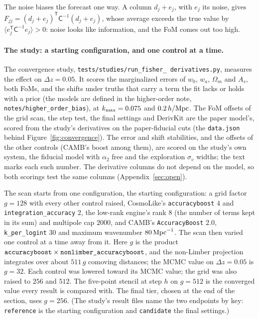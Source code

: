 \documentclass[11pt]{article}
\newcommand{\Cov}{\mathsf{C}}
\newcommand{\T}{^{\mathsf{T}}}
\newcommand{\kmax}{k_{\rm max}}
\newcommand{\hMpc}{\,h/{\rm Mpc}}
\newcommand{\us}{\_\allowbreak}
\begin{document}
The noise biases the forecast one way.  A column $d_j + e_j$, with $e_j$
its noise, gives $F_{jj} = (d_j + e_j)\T\Cov^{-1}(d_j + e_j)$, whose
average exceeds the true value by $\langle e_j\T\Cov^{-1}e_j\rangle > 0$:
noise looks like information, and the FoM comes out too high.

\paragraph{The study: a starting configuration, and one control at a
time.}
The convergence study, \texttt{tests/studies/run\us fisher\us
derivatives.py}, measures the effect on $\Delta z = 0.05$.  It scores
the marginalized errors
of $w_0$, $w_a$, $\Omega_m$
and $A_s$, both FoMs, and the shifts under truths that carry a term the fit lacks or holds
with a prior (the models are
defined in the higher-order note,
\texttt{notes/higher\us order\us bias}), at
$\kmax = 0.075$ and $0.2\hMpc$.  The FoM offsets of the grid scan, the
step test, the final settings and DerivKit are the paper model's,
scored from the study's derivatives on the paper-fiducial cuts (the
\texttt{data.json} behind Figure~\ref{fig:convergence}).  The error
and shift stabilities, and the offsets of the other controls (CAMB's
boost among them), are
scored on the study's own system, the fiducial model with $\alpha_2$
free and the exploration $\sigma_v$ widths; the text marks each such
number.
The derivative columns do not
depend on the model, so both scorings test the same columns
(Appendix~\ref{sec:open}).

The scan starts from one configuration, the starting configuration: a
grid factor $g = 128$ with every other control raised, CosmoLike's
\texttt{accuracyboost} $4$ and \texttt{integration\us accuracy} $2$, the
low-rank engine's rank $8$ (the number of terms kept in its sum) and
multipole cap $2000$, and CAMB's \texttt{AccuracyBoost} $2.0$,
\texttt{k\us per\us logint} $30$ and maximum wavenumber
$80\,{\rm Mpc}^{-1}$.  The scan then varied one control at a time away
from it.  Here $g$ is the product
$\texttt{accuracyboost} \times \texttt{nonlimber\us accuracyboost}$, and
the non-Limber projection integrates over about $511\,g$ comoving
distances; the MCMC value on $\Delta z = 0.05$ is $g = 32$.  Each
control was lowered toward its MCMC value; the grid was also raised to
$256$ and $512$.  The five-point stencil at step $h$ on $g = 512$ is
the converged value every result is compared with.  The final tier,
chosen at the end of the section, uses $g = 256$.  (The study's result
files name the two endpoints by key: \texttt{reference} is the starting
configuration and \texttt{candidate} the final settings.)
\end{document}
